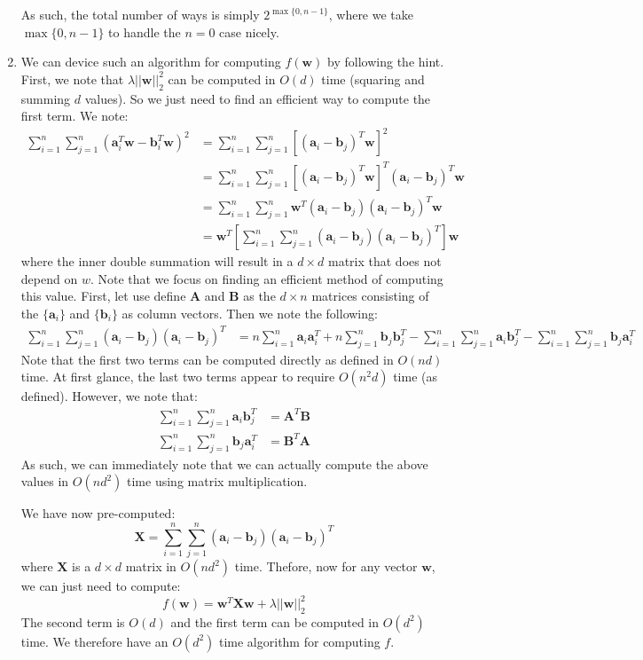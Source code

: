 \documentclass[12pt]{article}
\begin{document}
\begin{enumerate}[label=(\alph*)]
  As such, the total number of ways is simply $2^{\max\{0, n-1\}}$, where we take $\max\{0, n-1\}$ to handle the $n = 0$ case nicely.

  \item We can device such an algorithm for computing $f(\bm{w})$ by following the hint. First, we note that $\lambda || \bm{w} ||_2^2$ can be computed in $O(d)$ time (squaring and summing $d$ values). So we just need to find an efficient way to compute the first term. We note:
  \begin{align*}
    \sum_{i=1}^n \sum_{j=1}^n (\bm{a}_i^T \bm{w} - \bm{b}_i^T \bm{w})^2 &= \sum_{i=1}^n \sum_{j=1}^n [(\bm{a}_i -\bm{b}_j)^T\bm{w}]^2 \\
    &= \sum_{i=1}^n \sum_{j=1}^n [(\bm{a}_i -\bm{b}_j)^T\bm{w}]^T(\bm{a}_i -\bm{b}_j)^T\bm{w} \\
    &= \sum_{i=1}^n \sum_{j=1}^n \bm{w}^T(\bm{a}_i -\bm{b}_j)(\bm{a}_i -\bm{b}_j)^T\bm{w} \\
    &= \bm{w}^T \left[\sum_{i=1}^n \sum_{j=1}^n (\bm{a}_i -\bm{b}_j)(\bm{a}_i -\bm{b}_j)^T\right]\bm{w}
  \end{align*}
  where the inner double summation will result in a $d \times d$ matrix that does not depend on $w$. Note that we focus on finding an efficient method of computing this value. First, let use define $\bm{A}$ and $\bm{B}$ as the $d \times n$ matrices consisting of the $\{\bm{a}_i\}$ and $\{ \bm{b}_i\}$ as column vectors. Then we note the following:
  \begin{align*}
    \sum_{i=1}^n \sum_{j=1}^n (\bm{a}_i -\bm{b}_j)(\bm{a}_i -\bm{b}_j)^T &= n\sum_{i=1}^n \bm{a}_i\bm{a}_i^T + n \sum_{j=1}^n \bm{b}_j\bm{b}_j^T - \sum_{i=1}^n\sum_{j=1}^n \bm{a}_i\bm{b}_j^T - \sum_{i=1}^n\sum_{j=1}^n \bm{b}_j\bm{a}_i^T
  \end{align*}
  Note that the first two terms can be computed directly as defined in $O(nd)$ time. At first glance, the last two terms appear to require $O(n^2d)$ time (as defined). However, we note that:
  \begin{align*}
    \sum_{i=1}^n\sum_{j=1}^n \bm{a}_i\bm{b}_j^T &= \bm{A}^T\bm{B} \\
    \sum_{i=1}^n\sum_{j=1}^n \bm{b}_j\bm{a}_i^T &= \bm{B}^T\bm{A}
  \end{align*}
  As such, we can immediately note that we can actually compute the above values in $O(nd^2)$ time using matrix multiplication.

  We have now pre-computed:
  $$
    \bm{X} = \sum_{i=1}^n \sum_{j=1}^n (\bm{a}_i -\bm{b}_j)(\bm{a}_i -\bm{b}_j)^T
  $$
  where $\bm{X}$ is a $d \times d$ matrix in $O(nd^2)$ time. Thefore, now for any vector $\bm{w}$, we can just need to compute:
  $$
    f(\bm{w}) = \bm{w}^T\bm{X}\bm{w} + \lambda ||\bm{w}||_2^2
  $$
  The second term is $O(d)$ and the first term can be computed in $O(d^2)$ time. We therefore have an $O(d^2)$ time algorithm for computing $f$.
\end{enumerate}
\end{document}

